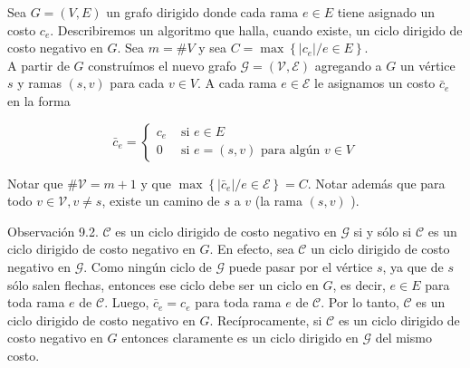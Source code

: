 \documentclass[10pt]{article}
\begin{document}
Sea $G=(V, E)$ un grafo dirigido donde cada rama $e \in E$ tiene asignado un costo $c_{e}$. Describiremos un algoritmo que halla, cuando existe, un ciclo dirigido de costo negativo en $G$. Sea $m=\# V$ y sea $C=\max \left\{\left|c_{e}\right| / e \in E\right\}$.\\
A partir de $G$ construímos el nuevo grafo $\mathcal{G}=(\mathcal{V}, \mathcal{E})$ agregando a $G$ un vértice $s$ y ramas $(s, v)$ para cada $v \in V$. A cada rama $e \in \mathcal{E}$ le asignamos un costo $\bar{c}_{e}$ en la forma

$$
\bar{c}_{e}= \begin{cases}c_{e} & \text { si } e \in E \\ 0 & \text { si } e=(s, v) \text { para algún } v \in V\end{cases}
$$

Notar que $\# \mathcal{V}=m+1$ y que $\max \left\{\left|\bar{c}_{e}\right| / e \in \mathcal{E}\right\}=C$. Notar además que para todo $v \in \mathcal{V}, v \neq s$, existe un camino de $s$ a $v$ (la rama $(s, v)$ ).

Observación 9.2. $\mathcal{C}$ es un ciclo dirigido de costo negativo en $\mathcal{G}$ si y sólo si $\mathcal{C}$ es un ciclo dirigido de costo negativo en $G$. En efecto, sea $\mathcal{C}$ un ciclo dirigido de costo negativo en $\mathcal{G}$. Como ningún ciclo de $\mathcal{G}$ puede pasar por el vértice $s$, ya que de $s$ sólo salen flechas, entonces ese ciclo debe ser un ciclo en $G$, es decir, $e \in E$ para toda rama $e$ de $\mathcal{C}$. Luego, $\bar{c}_{e}=c_{e}$ para toda rama $e$ de $\mathcal{C}$. Por lo tanto, $\mathcal{C}$ es un ciclo dirigido de costo negativo en $G$. Recíprocamente, si $\mathcal{C}$ es un ciclo dirigido de costo negativo en $G$ entonces claramente es un ciclo dirigido en $\mathcal{G}$ del mismo costo.
\end{document}
